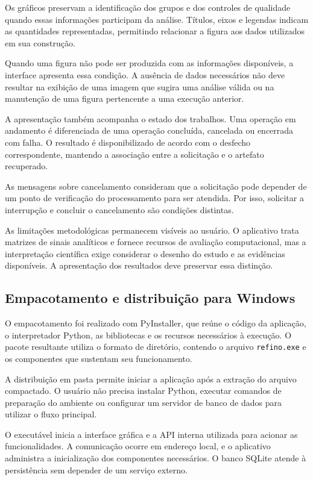 Os gráficos preservam a identificação dos grupos e dos controles de qualidade quando essas informações participam da análise. Títulos, eixos e legendas indicam as quantidades representadas, permitindo relacionar a figura aos dados utilizados em sua construção.

Quando uma figura não pode ser produzida com as informações disponíveis, a interface apresenta essa condição. A ausência de dados necessários não deve resultar na exibição de uma imagem que sugira uma análise válida ou na manutenção de uma figura pertencente a uma execução anterior.

A apresentação também acompanha o estado dos trabalhos. Uma operação em andamento é diferenciada de uma operação concluída, cancelada ou encerrada com falha. O resultado é disponibilizado de acordo com o desfecho correspondente, mantendo a associação entre a solicitação e o artefato recuperado.

As mensagens sobre cancelamento consideram que a solicitação pode depender de um ponto de verificação do processamento para ser atendida. Por isso, solicitar a interrupção e concluir o cancelamento são condições distintas.

As limitações metodológicas permanecem visíveis ao usuário. O aplicativo trata matrizes de sinais analíticos e fornece recursos de avaliação computacional, mas a interpretação científica exige considerar o desenho do estudo e as evidências disponíveis. A apresentação dos resultados deve preservar essa distinção.

\subsection{Empacotamento e distribuição para Windows}
\label{subsec:empacotamento-windows}

O empacotamento foi realizado com PyInstaller, que reúne o código da aplicação, o interpretador Python, as bibliotecas e os recursos necessários à execução. O pacote resultante utiliza o formato de diretório, contendo o arquivo \texttt{refino.exe} e os componentes que sustentam seu funcionamento.

A distribuição em pasta permite iniciar a aplicação após a extração do arquivo compactado. O usuário não precisa instalar Python, executar comandos de preparação do ambiente ou configurar um servidor de banco de dados para utilizar o fluxo principal.

O executável inicia a interface gráfica e a API interna utilizada para acionar as funcionalidades. A comunicação ocorre em endereço local, e o aplicativo administra a inicialização dos componentes necessários. O banco SQLite atende à persistência sem depender de um serviço externo.

